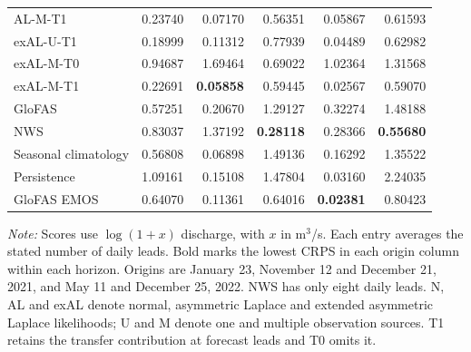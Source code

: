 \begin{table}[!htbp]
\begin{threeparttable}
\begin{tabular}{lrrrrr}
AL-M-T1 & 0.23740 & 0.07170 & 0.56351 & 0.05867 & 0.61593 \\
exAL-U-T1 & 0.18999 & 0.11312 & 0.77939 & 0.04489 & 0.62982 \\
exAL-M-T0 & 0.94687 & 1.69464 & 0.69022 & 1.02364 & 1.31568 \\
exAL-M-T1 & 0.22691 & \textbf{0.05858} & 0.59445 & 0.02567 & 0.59070 \\
GloFAS & 0.57251 & 0.20670 & 1.29127 & 0.32274 & 1.48188 \\
NWS & 0.83037 & 1.37192 & \textbf{0.28118} & 0.28366 & \textbf{0.55680} \\
Seasonal climatology & 0.56808 & 0.06898 & 1.49136 & 0.16292 & 1.35522 \\
Persistence & 1.09161 & 0.15108 & 1.47804 & 0.03160 & 2.24035 \\
GloFAS EMOS & 0.64070 & 0.11361 & 0.64016 & \textbf{0.02381} & 0.80423 \\
\hline
\end{tabular}
\begin{tablenotes}\footnotesize
\item \textit{Note:} Scores use $\log(1+x)$ discharge, with $x$ in m$^3$/s. Each entry averages the stated number of daily leads. Bold marks the lowest CRPS in each origin column within each horizon. Origins are January 23, November 12 and December 21, 2021, and May 11 and December 25, 2022. NWS has only eight daily leads. N, AL and exAL denote normal, asymmetric Laplace and extended asymmetric Laplace likelihoods; U and M denote one and multiple observation sources. T1 retains the transfer contribution at forecast leads and T0 omits it.
\end{tablenotes}
\end{threeparttable}
\end{table}
